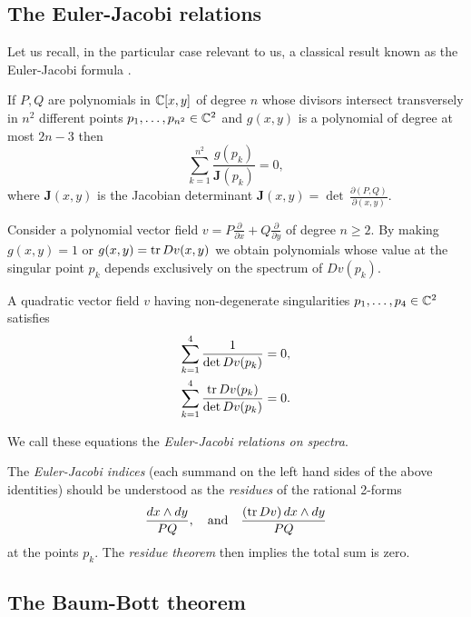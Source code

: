 \documentclass[phd,tocprelim]{cornell}
\begin{document}
\subsection{The Euler-Jacobi relations}

Let us recall, in the particular case relevant to us, a classical result known as the Euler-Jacobi formula \cite[Chpt.~5, Sec.~2]{GriffithsHarris1994}.

\begin{theorem}\label{thm:EJformula}
If $P,Q$ are polynomials in $\mathbb{C}[x,y]$ of degree $n$ whose divisors intersect transversely in $n^2$ different points $p_1,\ldots,p_{n^2}\in\mathbb{C}^2$ and $g(x,y)$ is a polynomial of degree at most $2n-3$ then
\[ \sum_{k=1}^{n^2} \frac{g(p_k)}{\mathbf{J}(p_k)}=0, \]
where $\mathbf{J}(x,y)$ is the Jacobian determinant $\mathbf{J}(x,y)=\operatorname{det}\,\displaystyle\frac{\partial(P,Q)}{\partial(x,y)}$.
\end{theorem}

Consider a polynomial vector field $v=P\frac{\partial}{\partial x}+Q\frac{\partial}{\partial y}$ of degree $n\geq2$. By making $g(x,y)=1$ or $g(x,y)=\operatorname{tr}{Dv(x,y)}$ we obtain polynomials whose value at the singular point $p_k$ depends exclusively on the spectrum of $Dv(p_k)$.

\begin{corollary}\label{coro:EJrelations}
A quadratic vector field $v$ having non-degenerate singularities $p_1,\ldots,p_{4}\in\mathbb{C}^2$ satisfies
\begin{align}
 \sum_{k=1}^{4}\frac{1}{\det{Dv(p_k)}}=0, \label{eq:EJ1}\\
 \sum_{k=1}^{4}\frac{\operatorname{tr}{Dv(p_k)}}{\det{Dv(p_k)}}=0. \label{eq:EJ2}
\end{align}
\end{corollary}
\noindent We call these equations the \emph{Euler-Jacobi relations on spectra}.

\begin{remark}
 The \textit{Euler-Jacobi indices} (each summand on the left hand sides of the above identities) should be understood as the \textit{residues} of the rational 2-forms
  \[ \frac{dx\wedge dy}{PQ}, \quad \text{and} \quad \frac{(\operatorname{tr} Dv)\,dx\wedge dy}{PQ} \]
 at the points $p_k$. The \textit{residue theorem} then implies the total sum is zero.
\end{remark}



\subsection{The Baum-Bott theorem}
\end{document}
